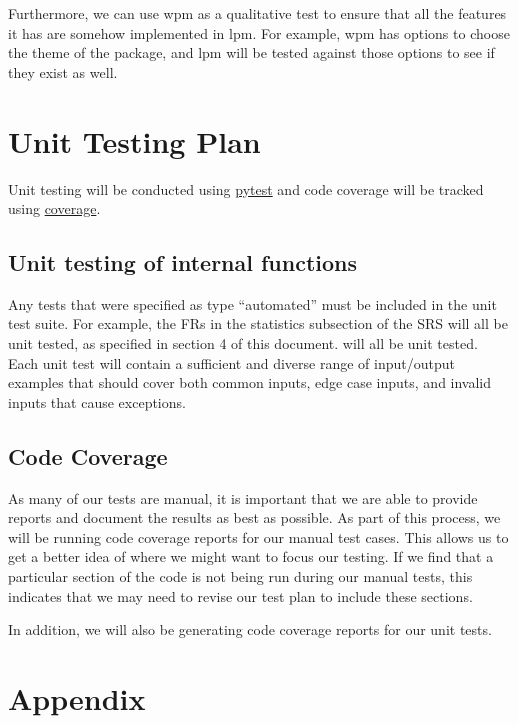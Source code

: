\documentclass[12pt, titlepage]{article}
\begin{document}
Furthermore, we can use wpm as a qualitative test to ensure that all the features it has are somehow implemented in lpm. For example, wpm has options to choose the theme of the package, and lpm will be tested against those options to see if they exist as well.

\section{Unit Testing Plan}
\noindent Unit testing will be conducted using \href{https://docs.pytest.org/en/stable/}{pytest} and code coverage will be tracked using \href{https://coverage.readthedocs.io/en/coverage-5.5/#}{coverage}.

\subsection{Unit testing of internal functions}
Any tests that were specified as type ``automated'' must be included in the unit test suite. For example, the FRs in the statistics subsection of the SRS will all be unit tested, as specified in section 4 of this document. will all be unit tested. Each unit test will contain a sufficient and diverse range of input/output examples that should cover both common inputs, edge case inputs, and invalid inputs that cause exceptions.

\subsection{Code Coverage}
As many of our tests are manual, it is important that we are able to provide reports and document the results as best as possible. As part of this process, we will be running code coverage reports for our manual test cases. This allows us to get a better idea of where we might want to focus our testing. If we find that a particular section of the code is not being run during our manual tests, this indicates that we may need to revise our test plan to include these sections.

In addition, we will also be generating code coverage reports for our unit tests.





\newpage

\section{Appendix}
\end{document}
